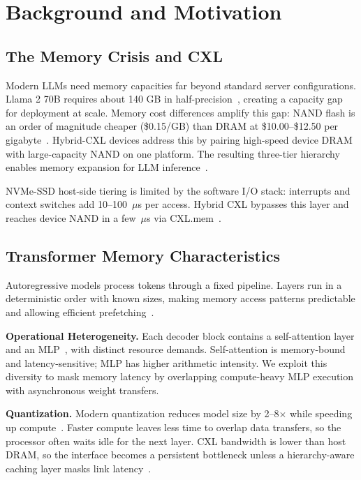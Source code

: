 \documentclass[10pt,conference,letterpaper]{IEEEtran}
\begin{document}
\section{Background and Motivation}
\label{sec:background_motivation}

\subsection{The Memory Crisis and CXL}
\noindent
Modern LLMs need memory capacities far beyond standard server configurations. Llama 2 70B requires about 140 GB in half-precision~\cite{touvron2023llama2openfoundation}, creating a capacity gap for deployment at scale. Memory cost differences amplify this gap: NAND flash is an order of magnitude cheaper (\$0.15/GB) than DRAM at \$10.00--\$12.50 per gigabyte~\cite{ddr5pricing2026,pcmag2025soar}. Hybrid-CXL devices address this by pairing high-speed device DRAM with large-capacity NAND on one platform. The resulting three-tier hierarchy enables memory expansion for LLM inference~\cite{soltaniyeh2025revisiting}.

NVMe-SSD host-side tiering is limited by the software I/O stack: interrupts and context switches add 10--100~$\mu$s per access. Hybrid CXL bypasses this layer and reaches device NAND in a few~$\mu$s via CXL.mem~\cite{zeng2025performance}.

\subsection{Transformer Memory Characteristics}
\noindent
Autoregressive models process tokens through a fixed pipeline. Layers run in a deterministic order with known sizes, making memory access patterns predictable and allowing efficient prefetching~\cite{kim2025lia,tang2024exploring}.

\noindent\textbf{Operational Heterogeneity.} Each decoder block contains a self-attention layer and an MLP~\cite{jiang2023mistral7b}, with distinct resource demands. Self-attention is memory-bound and latency-sensitive; MLP has higher arithmetic intensity. We exploit this diversity to mask memory latency by overlapping compute-heavy MLP execution with asynchronous weight transfers.

\noindent\textbf{Quantization.} Modern quantization reduces model size by 2--8$\times$ while speeding up compute~\cite{dettmers2022gpt3}. Faster compute leaves less time to overlap data transfers, so the processor often waits idle for the next layer. CXL bandwidth is lower than host DRAM, so the interface becomes a persistent bottleneck unless a hierarchy-aware caching layer masks link latency~\cite{kim2025lia}.
\end{document}
